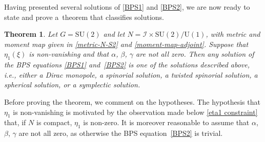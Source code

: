 \documentclass[pdftex]{sigma}
\newcommand{\II}{{\mathcal{I}}}
\newcommand{\SU}{{\mathrm{SU}}}
\newcommand{\U}{{\mathrm{U}}}
\newcommand{\1}{{\mathbb{1}}}
\numberwithin{equation}{section}
\newtheorem{Theorem}{Theorem}[section]
\begin{document}
Having presented several solutions of \eqref{BPS1} and \eqref{BPS2}, we are now ready to state and prove a~theorem that classifies solutions.
\begin{Theorem}\label{thm:classification-S2}
Let $G=\SU(2)$ and let $N=\II\times \SU(2)/\U(1)$, with metric and moment map given in \eqref{metric-N-S2} and \eqref{moment-map-adjoint}. Suppose that $\eta_1(\xi)$ is non-vanishing and that $\alpha$, $\beta$, $\gamma$ are not all zero. Then any solution of the BPS equations \eqref{BPS1} and~\eqref{BPS2} is one of the solutions described above, i.e., either a Dirac monopole, a spinorial solution, a twisted spinorial solution, a spherical solution, or a symplectic solution.
\end{Theorem}
Before proving the theorem, we comment on the hypotheses. The hypothesis that $\eta_1$ is non-vanishing is motivated by the observation made below \eqref{eta1 constraint} that, if $N$ is compact, $\eta_1$ is non-zero. It is moreover reasonable to assume that $\alpha$, $\beta$, $\gamma$ are not all zero, as otherwise the BPS equation~\eqref{BPS2} is trivial.
\end{document}
